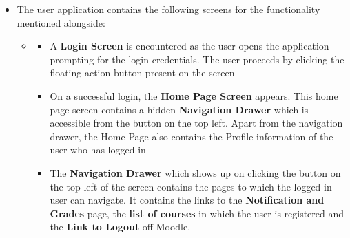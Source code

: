 \documentclass[12pt]{article}
\begin{document}
\begin{itemize}
\item The user application contains the following screens for the functionality mentioned alongside:
    \begin{itemize}
        \item
        \begin{itemize}
        \item A \textbf{Login Screen} is encountered as the user opens the application prompting for the login credentials. The user proceeds by clicking the floating action button present on the screen
        \item On a successful login, the \textbf{Home Page Screen} appears. This home page screen contains a hidden \textbf{Navigation Drawer} which is accessible from the button on the top left. Apart from the navigation drawer, the Home Page also contains the Profile information of the user who has logged in
        \item The \textbf{Navigation Drawer} which shows up on clicking the button on the top left of the screen contains the pages to which the logged in user can navigate. It contains the links to the \textbf{Notification and Grades} page, the \textbf{list of courses} in which the user is registered and the \textbf{Link to Logout} off Moodle.
        \end{itemize}
    \end{itemize}    
\end{itemize}
\end{document}
